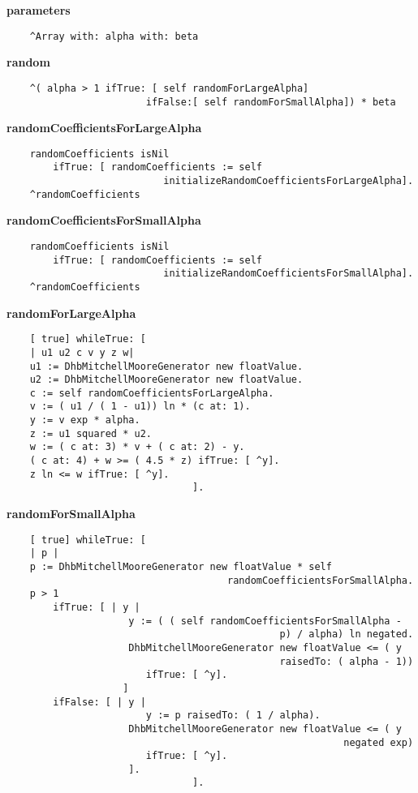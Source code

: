 {\bf parameters}
\begin{verbatim}
    ^Array with: alpha with: beta

\end{verbatim}
{\bf random}
\begin{verbatim}
    ^( alpha > 1 ifTrue: [ self randomForLargeAlpha]
                        ifFalse:[ self randomForSmallAlpha]) * beta

\end{verbatim}
{\bf randomCoefficientsForLargeAlpha}
\begin{verbatim}
    randomCoefficients isNil
        ifTrue: [ randomCoefficients := self 
                           initializeRandomCoefficientsForLargeAlpha].
    ^randomCoefficients

\end{verbatim}
{\bf randomCoefficientsForSmallAlpha}
\begin{verbatim}
    randomCoefficients isNil
        ifTrue: [ randomCoefficients := self 
                           initializeRandomCoefficientsForSmallAlpha].
    ^randomCoefficients

\end{verbatim}
{\bf randomForLargeAlpha}
\begin{verbatim}
    [ true] whileTrue: [
    | u1 u2 c v y z w|
    u1 := DhbMitchellMooreGenerator new floatValue.
    u2 := DhbMitchellMooreGenerator new floatValue.
    c := self randomCoefficientsForLargeAlpha.
    v := ( u1 / ( 1 - u1)) ln * (c at: 1).
    y := v exp * alpha.
    z := u1 squared * u2.
    w := ( c at: 3) * v + ( c at: 2) - y.
    ( c at: 4) + w >= ( 4.5 * z) ifTrue: [ ^y].
    z ln <= w ifTrue: [ ^y].
                                ].

\end{verbatim}
{\bf randomForSmallAlpha}
\begin{verbatim}
    [ true] whileTrue: [
    | p |
    p := DhbMitchellMooreGenerator new floatValue * self 
                                      randomCoefficientsForSmallAlpha.
    p > 1
        ifTrue: [ | y |
                     y := ( ( self randomCoefficientsForSmallAlpha - 
                                               p) / alpha) ln negated.
                     DhbMitchellMooreGenerator new floatValue <= ( y 
                                               raisedTo: ( alpha - 1))
                        ifTrue: [ ^y].
                    ]
        ifFalse: [ | y |
                        y := p raisedTo: ( 1 / alpha).
                     DhbMitchellMooreGenerator new floatValue <= ( y 
                                                          negated exp)
                        ifTrue: [ ^y].
                     ].
                                ].

\end{verbatim}
